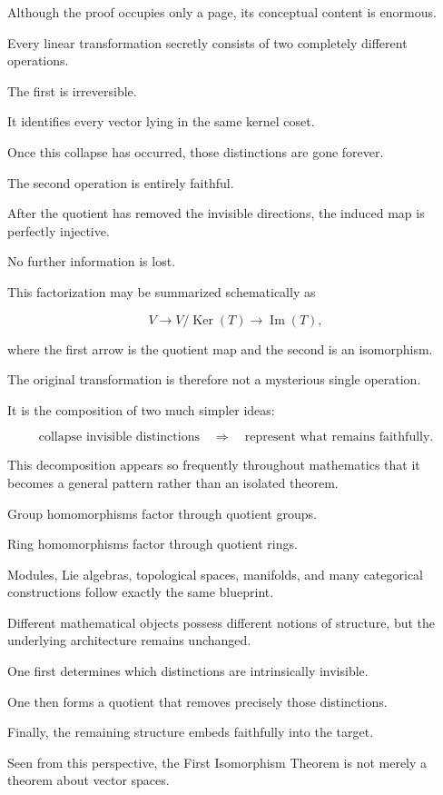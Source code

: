 \documentclass[11pt]{book}
\numberwithin{equation}{chapter}
\theoremstyle{definition}
\theoremstyle{plain}
\theoremstyle{remark}
\DeclareMathOperator{\Ker}{Ker}
\DeclareMathOperator{\Image}{Im}
\begin{document}
Although the proof occupies only a page, its conceptual content is enormous.

Every linear transformation secretly consists of two completely different operations.

The first is irreversible.

It identifies every vector lying in the same kernel coset.

Once this collapse has occurred, those distinctions are gone forever.

The second operation is entirely faithful.

After the quotient has removed the invisible directions, the induced map is perfectly injective.

No further information is lost.

This factorization may be summarized schematically as

\[
V
\longrightarrow
V/\Ker(T)
\longrightarrow
\Image(T),
\]

where the first arrow is the quotient map and the second is an isomorphism.

The original transformation is therefore not a mysterious single operation.

It is the composition of two much simpler ideas:

\[
\boxed{
\text{collapse invisible distinctions}
\quad\Longrightarrow\quad
\text{represent what remains faithfully}.
}
\]

This decomposition appears so frequently throughout mathematics that it becomes a general pattern rather than an isolated theorem.

Group homomorphisms factor through quotient groups.

Ring homomorphisms factor through quotient rings.

Modules, Lie algebras, topological spaces, manifolds, and many categorical constructions follow exactly the same blueprint.

Different mathematical objects possess different notions of structure, but the underlying architecture remains unchanged.

One first determines which distinctions are intrinsically invisible.

One then forms a quotient that removes precisely those distinctions.

Finally, the remaining structure embeds faithfully into the target.

Seen from this perspective, the First Isomorphism Theorem is not merely a theorem about vector spaces.
\end{document}
